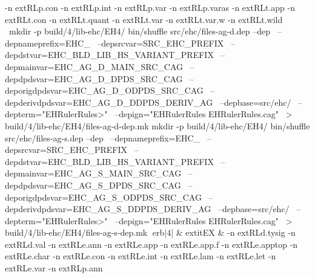 -n 	extRL{p.con}\hspace{.5em} 
-n 	extRL{p.int}\hspace{.5em} 
-n 	extRL{p.var}\hspace{.5em} 
-n 	extRL{p.varas}\hspace{.5em} 
-n 	extRL{t.app}\hspace{.5em} 
-n 	extRL{t.con}\hspace{.5em} 
-n 	extRL{t.quant}\hspace{.5em} 
-n 	extRL{t.var}\hspace{.5em} 
-n 	extRL{t.var.w}\hspace{.5em} 
-n 	extRL{t.wild}\hspace{.5em} 
\
mkdir -p build/4/lib-ehc/EH4/
bin/shuffle src/ehc/files-ag-d.dep --dep \
	  --depnameprefix=EHC_ \
	  --depsrcvar=SRC_EHC_PREFIX \
	  --depdstvar=EHC_BLD_LIB_HS_VARIANT_PREFIX \
	  --depmainvar=EHC_AG_D_MAIN_SRC_CAG \
	  --depdpdsvar=EHC_AG_D_DPDS_SRC_CAG \
	  --deporigdpdsvar=EHC_AG_D_ODPDS_SRC_CAG \
	  --depderivdpdsvar=EHC_AG_D_DDPDS_DERIV_AG \
	  --depbase=src/ehc/ \
	  --depterm="EHRulerRules>" \
	  --depign="EHRulerRules EHRulerRules.cag" \
	    > build/4/lib-ehc/EH4/files-ag-d-dep.mk
mkdir -p build/4/lib-ehc/EH4/
bin/shuffle src/ehc/files-ag-s.dep --dep \
	  --depnameprefix=EHC_ \
	  --depsrcvar=SRC_EHC_PREFIX \
	  --depdstvar=EHC_BLD_LIB_HS_VARIANT_PREFIX \
	  --depmainvar=EHC_AG_S_MAIN_SRC_CAG \
	  --depdpdsvar=EHC_AG_S_DPDS_SRC_CAG \
	  --deporigdpdsvar=EHC_AG_S_ODPDS_SRC_CAG \
	  --depderivdpdsvar=EHC_AG_S_DDPDS_DERIV_AG \
	  --depbase=src/ehc/ \
	  --depterm="EHRulerRules>" \
	  --depign="EHRulerRules EHRulerRules.cag" \
	    > build/4/lib-ehc/EH4/files-ag-s-dep.mk
erb|4| & 	extit{EX} & 
-n 	extRL{d.tysig}\hspace{.5em} 
-n 	extRL{d.val}\hspace{.5em} 
-n 	extRL{e.ann}\hspace{.5em} 
-n 	extRL{e.app}\hspace{.5em} 
-n 	extRL{e.app.f}\hspace{.5em} 
-n 	extRL{e.apptop}\hspace{.5em} 
-n 	extRL{e.char}\hspace{.5em} 
-n 	extRL{e.con}\hspace{.5em} 
-n 	extRL{e.int}\hspace{.5em} 
-n 	extRL{e.lam}\hspace{.5em} 
-n 	extRL{e.let}\hspace{.5em} 
-n 	extRL{e.var}\hspace{.5em} 
-n 	extRL{p.ann}\hspace{.5em} 

